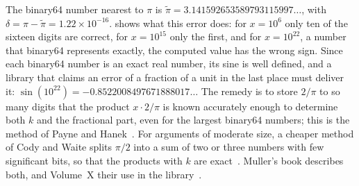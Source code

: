 The binary64 number nearest to $\pi$ is $\tilde\pi=3.141592653589793115997\ldots$, with $\delta=\pi-\tilde\pi=1.22\times10^{-16}$.  shows what this error does: for $x=10^6$ only ten of the sixteen digits are correct, for $x=10^{15}$ only the first, and for $x=10^{22}$, a number that binary64 represents exactly, the computed value has the wrong sign. Since each binary64 number is an exact real number, its sine is well defined, and a library that claims an error of a fraction of a unit in the last place must deliver it: $\sin(10^{22})=-0.8522008497671888017\ldots$ The remedy is to store $2/\pi$ to so many digits that the product $x\cdot2/\pi$ is known accurately enough to determine both $k$ and the fractional part, even for the largest binary64 numbers; this is the method of Payne and Hanek~\cite{payne1983}. For arguments of moderate size, a cheaper method of Cody and Waite splits $\pi/2$ into a sum of two or three numbers with few significant bits, so that the products with $k$ are exact~\cite{cody1980}. Muller's book describes both, and Volume~X their use in the library~\cite{muller2016elementary}.

\begin{table}
\end{table}


